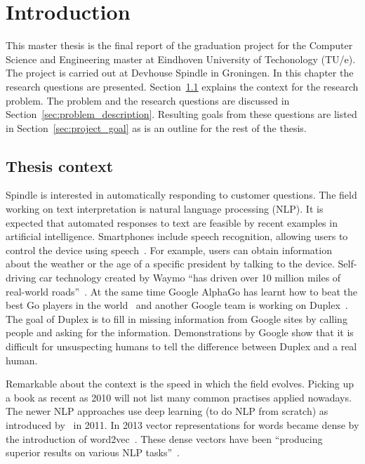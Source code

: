 \chapter{Introduction}
\label{ch:introduction}

\setcounter{page}{0}
This master thesis is the final report of the graduation project for the Computer Science and Engineering master at Eindhoven University of Techonology (TU/e).
The project is carried out at Devhouse Spindle in Groningen.
In this chapter the research questions are presented.
Section~\ref{sec:thesis_context} explains the context for the research problem.
The problem and the research questions are discussed in Section~\ref{sec:problem_description}.
Resulting goals from these questions are listed in Section~\ref{sec:project_goal} as is an outline for the rest of the thesis.

\section{Thesis context}
\label{sec:thesis_context}
Spindle is interested in automatically responding to customer questions.
The field working on text interpretation is natural language processing (NLP).
It is expected that automated responses to text are feasible by recent examples in artificial intelligence.
Smartphones include speech recognition, allowing users to control the device using speech~\citep{lopez2017alexa}.
For example, users can obtain information about the weather or the age of a specific president by talking to the device.
Self-driving car technology created by Waymo ``has driven over 10 million miles of real-world roads''~\citep{waymo2018}.
At the same time Google AlphaGo has learnt how to beat the best Go players in the world~\citep{gibney2016google} and another Google team is working on Duplex~\citep{leviathan2018google}.
The goal of Duplex is to fill in missing information from Google sites by calling people and asking for the information.
Demonstrations by Google show that it is difficult for unsuspecting humans to tell the difference between Duplex and a real human.

Remarkable about the context is the speed in which the field evolves.
Picking up a book as recent as 2010 will not list many common practises applied nowadays.
The newer NLP approaches use deep learning (to do NLP from scratch) as introduced by~\citet{collobert2011natural} in 2011.
In 2013 vector representations for words became dense by the introduction of word2vec~\citep{mikolov2013distributed}.
These dense vectors have been ``producing superior results on various NLP tasks''~\citep{young2018recent}.

